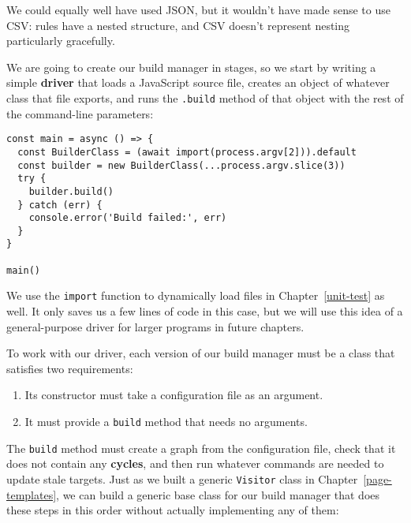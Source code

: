 \documentclass[krantzl]{krantz}
\newcommand{\chapref}[1]{Chapter~\ref{#1}}
\newcommand{\glossref}[1]{\textbf{#1}}
\begin{document}
\noindent We could equally well have used JSON,
but it wouldn’t have made sense to use CSV:
rules have a nested structure,
and CSV doesn’t represent nesting particularly gracefully.


We are going to create our build manager in stages,
so we start by writing a simple \glossref{driver} that loads a JavaScript source file,
creates an object of whatever class that file exports,
and runs the \texttt{.build} method of that object with the rest of the command-line parameters:


\begin{lstlisting}[frame=tblr]
const main = async () => {
  const BuilderClass = (await import(process.argv[2])).default
  const builder = new BuilderClass(...process.argv.slice(3))
  try {
    builder.build()
  } catch (err) {
    console.error('Build failed:', err)
  }
}

main()
\end{lstlisting}



\noindent We use the \texttt{import} function to dynamically load files in \chapref{unit-test} as well.
It only saves us a few lines of code in this case,
but we will use this idea of a general-purpose driver for larger programs in future chapters.


To work with our driver,
each version of our build manager must be a class that satisfies two requirements:

\begin{enumerate}

\item 

Its constructor must take a configuration file as an argument.



\item 

It must provide a \texttt{build} method that needs no arguments.



\end{enumerate}


\noindent The \texttt{build} method must create a graph from the configuration file,
check that it does not contain any \glossref{cycles},
and then run whatever commands are needed to update stale targets.
Just as we built a generic \texttt{Visitor} class in \chapref{page-templates},
we can build a generic base class for our build manager that does these steps in this order
without actually implementing any of them:
\end{document}
